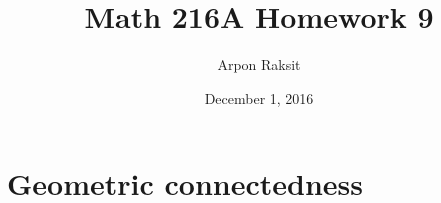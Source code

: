 

\title{Math 216A Homework 9}
\author{Arpon Raksit}
\date{December 1, 2016}




\maketitle



\section{Geometric connectedness}

